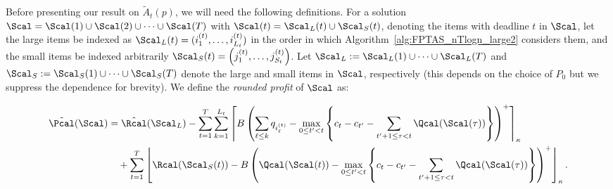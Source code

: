 Before presenting our result on $\widetilde{A}_t(p)$, we will need the following definitions. 
For a solution $\Scal =  \Scal(1) \cup \Scal(2) \cup \cdots \cup \Scal(T)$ with $\Scal(t) = \Scal_L(t) \cup \Scal_S(t)$, denoting the items with deadline $t$ in $\Scal$, let the large items be indexed as $\Scal_L(t) = (i^{(t)}_1, \ldots, i^{(t)}_{L_t})$ in the order in which Algorithm~\ref{alg:FPTAS_nTlogn_large2} considers them, and the small items be indexed arbitrarily $\Scal_S(t) = \left(j^{(t)}_1, \ldots, j^{(t)}_{S_t}\right)$. Let $\Scal_L := \Scal_L(1) \cup \cdots \cup \Scal_L(T)$ and $\Scal_S := \Scal_S(1) \cup \cdots \cup \Scal_S(T)$ denote the large and small items in $\Scal$, respectively (this depends on the choice of $P_0$ but we suppress the dependence for brevity). We define the {\it rounded profit} of $\Scal$ as:


\begin{align} \label{Ptilde}
\nonumber
\tilde{\Pcal}(\Scal) &= \hat{\Rcal}(\Scal_L) - \sum_{t=1}^T  \sum_{k=1}^{L_t} \left\lceil  B  \left( \sum_{\ell \leq k} q_{i^{(t)}_{\ell}} - \max_{0 \leq t' < t}\left\{ c_t - c_{t'} - \sum_{t'+1 \leq \tau <  t} \Qcal(\Scal(\tau)) \right\} \right)^+  \right\rceil_{\kappa} \\
& \quad 	+ \sum_{t=1}^T \left\lfloor \Rcal(\Scal_S(t)) - B \left(  \Qcal(\Scal(t))  - \max_{0 \leq t' < t}\left\{ c_t - c_{t'} - \sum_{t'+1 \leq \tau <  t} \Qcal(\Scal(\tau)) \right\} \right)^+ \right\rfloor_\kappa.
\end{align}





